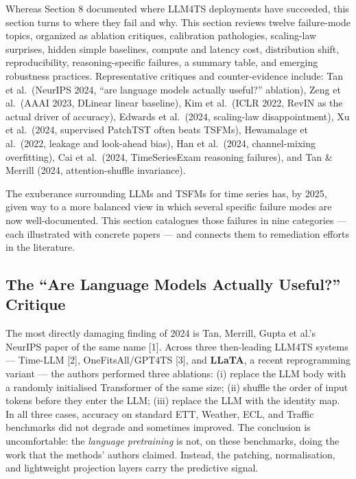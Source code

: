 \documentclass{article}
\begin{document}
Whereas Section 8 documented where LLM4TS deployments have succeeded, this section turns to where they fail and why. This section reviews twelve failure-mode topics, organized as ablation critiques, calibration pathologies, scaling-law surprises, hidden simple baselines, compute and latency cost, distribution shift, reproducibility, reasoning-specific failures, a summary table, and emerging robustness practices. Representative critiques and counter-evidence include: Tan et al.~(NeurIPS 2024, ``are language models actually useful?'' ablation), Zeng et al.~(AAAI 2023, DLinear linear baseline), Kim et al.~(ICLR 2022, RevIN as the actual driver of accuracy), Edwards et al.~(2024, scaling-law disappointment), Xu et al.~(2024, supervised PatchTST often beats TSFMs), Hewamalage et al.~(2022, leakage and look-ahead bias), Han et al.~(2024, channel-mixing overfitting), Cai et al.~(2024, TimeSeriesExam reasoning failures), and Tan \& Merrill (2024, attention-shuffle invariance).

The exuberance surrounding LLMs and TSFMs for time series has, by 2025, given way to a more balanced view in which several specific failure modes are now well-documented. This section catalogues those failures in nine categories --- each illustrated with concrete papers --- and connects them to remediation efforts in the literature.

\subsection{The ``Are Language Models Actually Useful?'' Critique}\label{the-are-language-models-actually-useful-critique}

The most directly damaging finding of 2024 is Tan, Merrill, Gupta et al.'s NeurIPS paper of the same name {[}1{]}. Across three then-leading LLM4TS systems --- Time-LLM {[}2{]}, OneFitsAll/GPT4TS {[}3{]}, and \textbf{LLaTA}, a recent reprogramming variant --- the authors performed three ablations: (i) replace the LLM body with a randomly initialised Transformer of the same size; (ii) shuffle the order of input tokens before they enter the LLM; (iii) replace the LLM with the identity map. In all three cases, accuracy on standard ETT, Weather, ECL, and Traffic benchmarks did not degrade and sometimes improved. The conclusion is uncomfortable: the \emph{language pretraining} is not, on these benchmarks, doing the work that the methods' authors claimed. Instead, the patching, normalisation, and lightweight projection layers carry the predictive signal.
\end{document}
